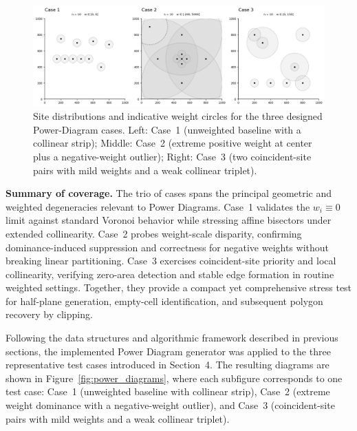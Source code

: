 \documentclass{article}
\begin{document}
\begin{figure}[H]
    \centering
    \includegraphics[width=0.95\linewidth]{Pictures/sites_cases.png}
    \caption{Site distributions and indicative weight circles for the three designed Power-Diagram cases. 
    Left: Case~1 (unweighted baseline with a collinear strip); 
    Middle: Case~2 (extreme positive weight at center plus a negative-weight outlier); 
    Right: Case~3 (two coincident-site pairs with mild weights and a weak collinear triplet).}
\end{figure}

\textbf{Summary of coverage.}
The trio of cases spans the principal geometric and weighted degeneracies relevant to Power Diagrams. 
Case~1 validates the $w_i\!\equiv\!0$ limit against standard Voronoi behavior while stressing affine bisectors under extended collinearity. 
Case~2 probes weight-scale disparity, confirming dominance-induced suppression and correctness for negative weights without breaking linear partitioning. 
Case~3 exercises coincident-site priority and local collinearity, verifying zero-area detection and stable edge formation in routine weighted settings. 
Together, they provide a compact yet comprehensive stress test for half-plane generation, empty-cell identification, and subsequent polygon recovery by clipping.


Following the data structures and algorithmic framework described in previous sections, the implemented Power Diagram generator was applied to the three representative test cases introduced in Section~4.  
The resulting diagrams are shown in Figure~\ref{fig:power_diagrams}, where each subfigure corresponds to one test case:
Case~1 (unweighted baseline with collinear strip),
Case~2 (extreme weight dominance with a negative-weight outlier),
and Case~3 (coincident-site pairs with mild weights and a weak collinear triplet).
\end{document}
